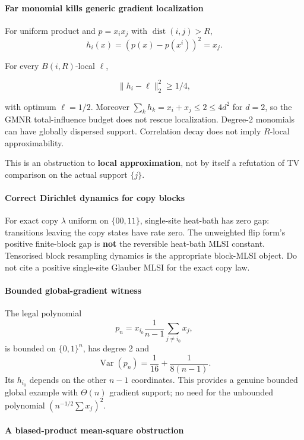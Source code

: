 \paragraph{Far monomial kills generic gradient localization}\label{far-monomial-kills-generic-gradient-localization}

For uniform product and \(p=x_ix_j\) with \(\operatorname{dist}(i,j)>R\),
\[h_i(x)=(p(x)-p(x^i))^2=x_j.\]

For every \(B(i,R)\)-local \(\ell\),

\[\|h_i-\ell\|_2^2\ge1/4,\]

with optimum \(\ell=1/2\). Moreover \(\sum_kh_k=x_i+x_j\le2\le4d^2\) for \(d=2\), so the GMNR total-influence budget does not rescue localization. Degree-2 monomials can have globally dispersed support. Correlation decay does not imply \(R\)-local approximability.

This is an obstruction to \textbf{local approximation}, not by itself a refutation of TV comparison on the actual support \(\{j\}\).

\paragraph{Correct Dirichlet dynamics for copy blocks}\label{correct-dirichlet-dynamics-for-copy-blocks}

For exact copy \(\lambda\) uniform on \(\{00,11\}\), single-site heat-bath has zero gap: transitions leaving the copy states have rate zero. The unweighted flip form's positive finite-block gap is \textbf{not} the reversible heat-bath MLSI constant. Tensorised block resampling dynamics is the appropriate block-MLSI object. Do not cite a positive single-site Glauber MLSI for the exact copy law.

\paragraph{Bounded global-gradient witness}\label{bounded-global-gradient-witness}

The legal polynomial
\[p_n=x_{i_0}\frac1{n-1}\sum_{j\ne i_0}x_j,\]
is bounded on \(\{0,1\}^n\), has degree 2 and
\[\operatorname{Var}(p_n)=\frac1{16}+\frac1{8(n-1)}.\]
Its \(h_{i_0}\) depends on the other \(n-1\) coordinates. This provides a genuine bounded global example with \(\Theta(n)\) gradient support; no need for the unbounded polynomial \((n^{-1/2}\sum x_j)^2\).

\paragraph{A biased-product mean-square obstruction}\label{a-biased-product-mean-square-obstruction}

